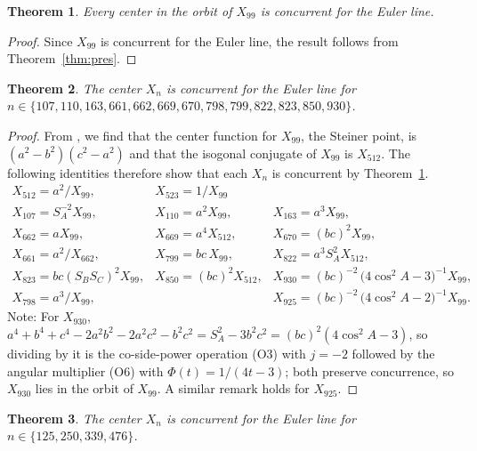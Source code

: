 \documentclass[12pt,a4paper]{amsart}
\newtheorem{theorem}{Theorem} [section]
\theoremstyle{remark}
\begin{document}
\begin{theorem}\label{thm:orbit}
Every center in the orbit of $X_{99}$ is concurrent for the Euler line.
\end{theorem}

\begin{proof}
Since $X_{99}$ is concurrent for the Euler line, the result follows from Theorem~\ref{thm:pres}.
\end{proof}

\begin{theorem}\label{cor:members}
The center $X_n$ is concurrent for the Euler line for\\
$n\in\{107,110,163,661,662,669,670,798,799,822,823,850,930\}$.
\end{theorem}

\begin{proof}
From \cite{ETC}, we find that the center function for $X_{99}$, the Steiner point,
is $(a^2-b^2)(c^2-a^2)$ and that the isogonal conjugate of $X_{99}$ is $X_{512}$.
The following identities therefore show that each $X_n$ is concurrent by Theorem~\ref{thm:orbit}.
\[
\begin{array}{llll}
X_{512}=a^2/X_{99}, &X_{523}=1/X_{99}&\\[2pt]
X_{107}=S_A^{-2}X_{99}, &X_{110}=a^{2}X_{99}, &  X_{163}=a^{3}X_{99}, &\\[2pt]
X_{662}=aX_{99}, & X_{669}=a^4X_{512}, & X_{670}=(bc)^{2}X_{99}, & \\[2pt]
X_{661}=a^2/X_{662}, & X_{799}=bc\,X_{99}, & X_{822}=a^{3}S_A^{2}X_{512}, &\\[2pt]
X_{823}=bc(S_BS_C)^{2}X_{99}, & X_{850}=(bc)^{2}X_{512}, &X_{930} = (bc)^{-2}\,\bigl(4\cos^{2}\!A - 3\bigr)^{-1} X_{99}, &\\[2pt]
X_{798}=a^3/X_{99}, & &X_{925} = (bc)^{-2}\,\bigl(4\cos^{2}\!A - 2\bigr)^{-1} X_{99}.
\end{array}
\]
Note: For $X_{930}$, $a^4+b^4+c^4-2a^2b^2-2a^2c^2-b^2c^2 = S_A^{2}-3b^2c^2 = (bc)^2(4\cos^2\!A-3)$,
so dividing by it is the co-side-power operation (O3) with $j=-2$ followed by the
angular multiplier (O6) with $\Phi(t)=1/(4t-3)$; both preserve concurrence, so
$X_{930}$ lies in the orbit of $X_{99}$. A similar remark holds for $X_{925}$.
\end{proof}

\begin{theorem}
The center $X_n$ is concurrent for the Euler line for\\
$n\in\{125, 250, 339, 476\}$.
\end{theorem}
\end{document}

